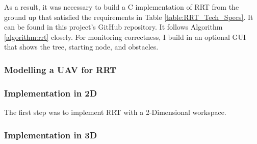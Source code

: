     As a result, it was necessary to build a C implementation of RRT from the ground up that satisfied the requirements in Table \ref{table:RRT_Tech_Specs}. It can be found in this project's GitHub repository. It follows Algorithm \ref{algorithm:rrt} closely. For monitoring correctness, I build in an optional \gls{GUI} that shows the tree, starting node, and obstacles.

    \subsubsection*{Modelling a \gls{UAV} for RRT}

    \subsubsection{Implementation in 2D}
    The first step was to implement RRT with a 2-Dimensional workspace. 
    

    \subsubsection{Implementation in 3D}
    
